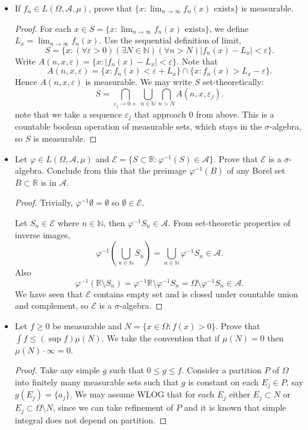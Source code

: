 \begin{itemize}
	\item If $f_n \in L(\Omega, \mathcal{A}, \mu)$, prove that $\{x: \lim_{n \to \infty} f_n(x) \text{ exists}\} $ is measurable.
\begin{proof}
	For each $x \in S = \{x: \lim_{n \to \infty} f_n(x) \text{ exists}\} $, we define $L_x = \lim_{n \to \infty} f_n(x)$.
	Use the sequential definition of limit,
	\[
		S = \{x: \left( \forall \varepsilon>0 \right)  \left( \exists N \in \mathbb{N} \right)  \left( \forall n > N \right)  \left| f_n(x) - L_x \right|< \varepsilon \} 
	.\] 
	Write $A(n, x, \varepsilon) = \{x: \left| f_n(x) - L_x \right| <\varepsilon\} $. Note that
	\[
		A(n, x, \varepsilon) = \{x: f_n(x) < \varepsilon + L_x\} \cap \{x: f_n(x) > L_x - \varepsilon\} 
	.\] 
	Hence $A(n, x, \varepsilon)$ is measurable. We may write $S$ set-theoretically:
	\[
		S = \bigcap_{\varepsilon_j \to 0+} \bigcup_{n \in \mathbb{N}} \bigcap_{n > N} A(n, x, \varepsilon_j)
	.\] 
	note that we take a sequence $\varepsilon_j$ that approach $0$ from above. This is a countable boolean operation of measurable sets, which stays in the  $\sigma$-algebra, so $S$ is measurable.
\end{proof}

	\item Let $\varphi \in L(\Omega, \mathcal{A}, \mu)$ and $\mathcal{E} = \{S \subset \mathbb{R}: \varphi^{-1} (S) \in \mathcal{A}\} $. Prove that $\mathcal{E}$ is a $\sigma$-algebra. Conclude from this that the preimage $\varphi^{-1} (B)$ of any Borel set $B \subset \mathbb{R}$ is in $\mathcal{A}$.
\begin{proof}
	Trivially, $\varphi^{-1} \emptyset  = \emptyset $ so $\emptyset  \in \mathcal{E}$.

	Let $S_n \in \mathcal{E}$ where $n \in \mathbb{N}$, then $\varphi^{-1} S_n \in \mathcal{A}$. From set-theoretic properties of inverse images,
\[
		\varphi^{-1} \left( \bigcup_{n \in \mathbb{N}} S_n \right)  = \bigcup_{n \in \mathbb{N}} \varphi^{-1} S_n  \in \mathcal{A}
	.\]
	Also
	\[
		\varphi^{-1} \left( \mathbb{R} \setminus S_n \right) = \varphi^{-1} \mathbb{R} \setminus \varphi^{-1} S_n
		= \Omega \setminus \varphi^{-1} S_n \in \mathcal{A}
	.\] 
	We have seen that $\mathcal{E}$ contains empty set and is closed under countable union and complement, so $\mathcal{E}$ is a $\sigma$-algebra.
\end{proof}
\newpage
\item Let $f\ge 0$ be measurable and $N = \{x \in \Omega: f(x) >0\} $. Prove that $\int f \le \left( \operatorname{sup} f \right) \mu(N)$. We take the convention that if $\mu(N) = 0$ then $\mu(N) \cdot \infty  = 0$.
\begin{proof}
Take any simple  $g$ such that $0 \le  g \le f$. Consider a partition $P$ of $\Omega$ into finitely many measurable sets such that $g$ is constant on each $E_j \in P$, say $g(E_j) = \{a_j\} $. We may assume WLOG that for each $E_j$ either $E_j \subset N$ or $E_j \subset \Omega \setminus N$, since we can take refinement of $P$ and it is known that simple integral does not depend on partition.


\end{proof}
\end{itemize}

